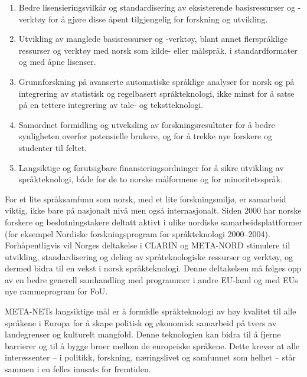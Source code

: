 \begin{multicols}{2}
\begin{enumerate}
\item Bedre lisensieringsvilkår og standardisering av eksisterende basisressurser og -verktøy for å gjøre disse åpent tilgjengelig for forskning og utvikling.
\item Utvikling av manglede basisressurser og -verktøy, blant annet flerspråklige ressurser og verktøy med norsk som kilde- eller målspråk, i standardformater og med åpne lisenser.
\item Grunnforskning på avanserte automatiske språklige analyser for norsk og på integrering av statistisk og regelbasert språkteknologi, ikke minst for å satse på en tettere integrering av tale- og tekstteknologi.
\item Samordnet formidling og utveksling av forskningsresultater for å bedre synligheten overfor potensielle brukere, og for å trekke nye forskere og studenter til feltet.
\item Langsiktige og forutsigbare finansieringsordninger for å sikre utvikling av språkteknologi, både for de to norske målformene og for minoritetsspråk.
\end{enumerate}

For et lite språksamfunn som norsk, med et lite forskningsmiljø, er samarbeid viktig, ikke bare på nasjonalt nivå men også internasjonalt. Siden 2000 har norske forskere og beslutningstakere deltatt aktivt i ulike nordiske samarbeidsplattformer  (for eksempel Nordiske forskningsprogram for språkteknologi 2000--2004). Forhåpentligvis vil Norges deltakelse i CLARIN og META-NORD stimulere til utvikling, standardisering og deling av språteknologiske ressurser og verktøy, og dermed bidra til en vekst i norsk språkteknologi.
Denne deltakelsen må følges opp av en bedre generell samhandling med programmer i andre EU-land og med EUs nye rammeprogram for FoU.



META-NETs langsiktige mål er å formidle språkteknologi av høy kvalitet til alle språkene i Europa for å skape politisk og økonomisk samarbeid på tvers av landegrenser og kulturelt mangfold. Denne teknologien kan bidra til å fjerne barrierer og til å bygge broer mellom de europeiske språkene. Dette krever at alle interessenter – i politikk, forskning, næringslivet og samfunnet som helhet – står sammen i en felles innsats for fremtiden.
\end{multicols}

